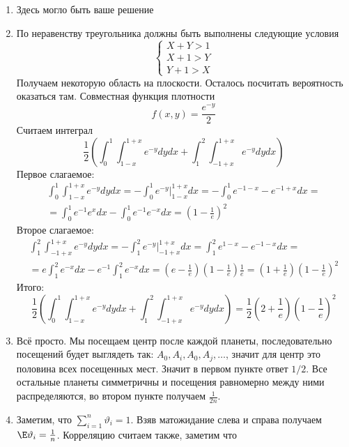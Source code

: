 \begin{enumerate}
\item Здесь могло быть ваше решение
\item По неравенству треугольника должны быть выполнены следующие условия
\begin{equation*}
\begin{cases}
X + Y > 1 \\
X + 1 > Y \\
Y  + 1 > X
\end{cases}
\end{equation*}
Получаем некоторую область на плоскости. Осталось посчитать вероятность оказаться там. Совместная функция плотности
\[
f(x, y) = \frac{e^{-y}}{2}
\]
Считаем интеграл
\[
\frac{1}{2}\left(  \int_{0}^1 \int_{1 - x}^{1 + x} e^{-y} dy dx  + \int_{1}^2 \int_{-1 + x}^{1 + x}  e^{-y} dy dx  \right)
\]
Первое слагаемое:
\begin{multline*}
 \int_{0}^1 \int_{1 - x}^{1 + x} e^{-y} dy dx = - \int_{0}^1 e^{-y} \bigg\vert_{1 - x}^{1 + x} dx = - \int_{0}^1 e^{-1 - x} - e^{- 1 + x} dx = \\
= \int_0^1 e^{-1} e^x dx - \int_{0}^1 e^{-1} e^{-x} dx = \left(1 -  \frac{1}{e}\right)^2
\end{multline*}
Второе слагаемое:
\begin{multline*}
\int_{1}^2 \int_{-1 + x}^{1 + x}  e^{-y} dy dx = - \int_{1}^2 e^{-y} \bigg\vert_{-1 + x}^{1 + x} dx = \int_1^2 e^{1 - x} - e^{- 1 - x} dx = \\
= e \int_1^2 e^{-x} dx - e^{-1} \int_1^2 e^{-x} dx = \left( e - \frac{1}{e}\right) \left( 1 - \frac{1}{e} \right) \frac{1}{e}  = \left( 1 + \frac{1}{e} \right) \left(1 -  \frac{1}{e}\right)^2
\end{multline*}
Итого:
\[
\frac{1}{2}\left(  \int_{0}^1 \int_{1 - x}^{1 + x} e^{-y} dy dx  + \int_{1}^2 \int_{-1 + x}^{1 + x}  e^{-y} dy dx  \right) = \frac{1}{2}  \left( 2 + \frac{1}{e} \right) \left(1 -  \frac{1}{e}\right)^2
\]
\item Всё просто. Мы посещаем центр после каждой планеты, последовательно посещений будет выглядеть так: $A_0, A_i, A_0, A_j, \ldots$, значит для центр это половина всех посещенных мест. Значит в первом пункте ответ $1/2$. Все остальные планеты  симметричны и посещения равномерно между ними распределяются, во втором пункте получаем $\frac{1}{2n}$.
\item Заметим, что $\sum_{i = 1}^n \vartheta_i = 1$. Взяв матожидание слева и справа получаем $\E \vartheta_i = \frac{1}{n}$. Корреляцию считаем также, заметим что

\end{enumerate}
